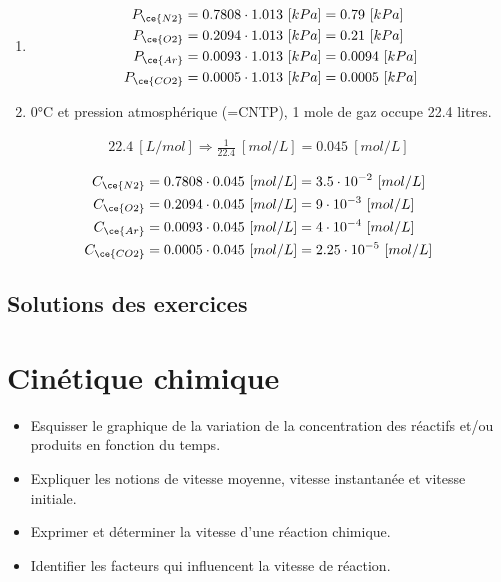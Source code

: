 \documentclass[
  11pt,
  a4paper,
  openany]{book}
\providecommand{\tightlist}{%
  \setlength{\itemsep}{0pt}\setlength{\parskip}{0pt}}
\begin{document}
\begin{Answer}

\begin{enumerate}
\def\labelenumi{\alph{enumi}.}
\tightlist
\item
  \[
  \begin{split}
   P_{\ce{N2}} &= 0.7808 \cdot 1.013\ [kPa] = 0.79\ [kPa] \\
   P_{\ce{O2}} &= 0.2094 \cdot 1.013\ [kPa] = 0.21\ [kPa] \\
   P_{\ce{Ar}} &= 0.0093 \cdot 1.013\ [kPa] = 0.0094\ [kPa] \\
   P_{\ce{CO2}} &= 0.0005 \cdot 1.013\ [kPa] = 0.0005\ [kPa]
  \end{split}
  \]
\item
  0°C et pression atmosphérique (=CNTP), 1 mole de gaz occupe 22.4 litres.
\end{enumerate}

\[
\begin{split}
22.4\ [L/mol] \Rightarrow \frac{1}{22.4}\ [mol/L] = 0.045\ [mol/L]
\end{split}
\]

\[
\begin{split}
    C_{\ce{N2}} &= 0.7808 \cdot 0.045\ [mol/L] = 3.5 \cdot 10^{-2}\ [mol/L] \\
    C_{\ce{O2}} &= 0.2094 \cdot 0.045\ [mol/L] = 9 \cdot 10^{-3}\ [mol/L] \\
    C_{\ce{Ar}} &= 0.0093 \cdot 0.045\ [mol/L] = 4 \cdot 10^{-4}\ [mol/L] \\
    C_{\ce{CO2}} &= 0.0005 \cdot 0.045\ [mol/L] = 2.25 \cdot 10^{-5}\ [mol/L]
\end{split}
\]

\end{Answer}

\newpage

\section{Solutions des exercices} \shipoutAnswer

\chapter{Cinétique chimique}\label{cinuxe9tique-chimique}

\begin{objectives}

\begin{itemize}
\tightlist
\item
  Esquisser le graphique de la variation de la concentration des réactifs et/ou produits en fonction du temps.
\item
  Expliquer les notions de vitesse moyenne, vitesse instantanée et vitesse initiale.
\item
  Exprimer et déterminer la vitesse d'une réaction chimique.
\item
  Identifier les facteurs qui influencent la vitesse de réaction.
\end{itemize}

\end{objectives}
\end{document}

